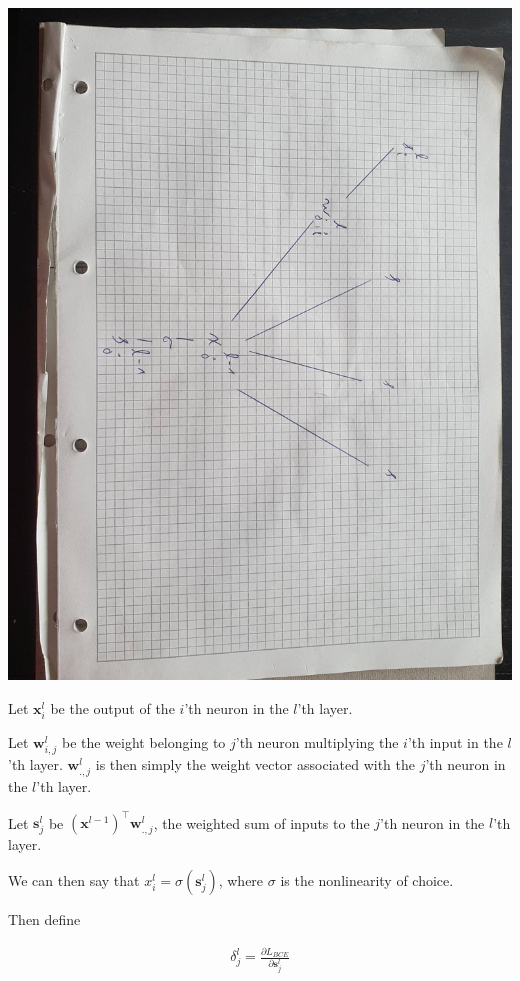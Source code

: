 \documentclass{article}
\begin{document}
	\includegraphics[angle=90,width=\textwidth]{notation_diagram}
	
	Let $\mathbf{x}^{l}_i$ be the output of the $i$'th neuron in the $l$'th layer. 
	
	Let $\mathbf{w}^l_{i, j}$ be the weight belonging to $j$'th neuron multiplying the $i$'th input in the $l$'th layer.  $\mathbf{w}^l_{.,j}$ is then simply the weight vector associated with the $j$'th neuron in the $l$'th layer.
	
	Let $\mathbf{s}^l_{j}$ be $(\mathbf{x}^{l-1})^\top\mathbf{w}^l_{.,j}$, the weighted sum of inputs to the $j$'th neuron in the $l$'th layer.
	
	We can then say that $x^l_i = \sigma(\mathbf{s}^l_j)$, where $\sigma$ is the nonlinearity of choice.
	
	Then define
	
	\begin{align}
		\delta^l_j = \frac{\partial L_{BCE}}{\partial \mathbf{s}^l_j}
	\end{align}
	
\end{document}
